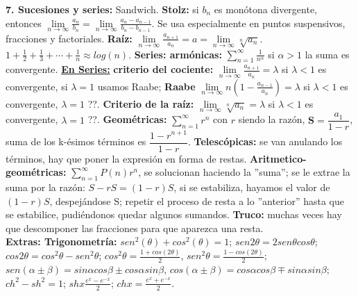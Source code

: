 \documentclass[a4paper, landscape, 11pt]{article}
\begin{document}
\textbf{7. Sucesiones y series:} Sandwich. \textbf{Stolz:} si $b_n$ es monótona divergente, entonces $\lim\limits_{n \to \infty}\frac{a_n}{b_n} = \lim\limits_{n \to \infty}\frac{a_n - a_{n-1}}{b_n - b_{n-1}}$. Se usa especialmente en puntos suspensivos, fracciones y factoriales. \textbf{Raíz:} $\lim\limits_{n \to \infty} \frac{a_{n + 1}}{a_n} = a = \lim\limits_{n\to \infty} \sqrt[n]{a_n}$. $1 + \frac{1}{2} + \frac{1}{3} + \cdots + \frac{1}{n} \approx log(n)$. \textbf{Series: armónicas:} $\sum\limits_{n=1}^{\infty}\frac{1}{n^{\alpha}}$ si $\alpha > 1$ la suma es convergente. \textbf{\underline{En Series:}} \textbf{criterio del cociente:} $\lim\limits_{n \to \infty} \frac{a_{n+1}}{a_n} = \lambda$ si $\lambda < 1$ es convergente, si $\lambda = 1$ usamos Raabe; \textbf{Raabe} $\lim\limits_{n \to \infty} n(1 - \frac{a_{n-1}}{a_n}) = \lambda$ si $\lambda < 1$ es convergente, $\lambda = 1$ ??. \textbf{Criterio de la raíz:} $\lim\limits_{n \to \infty} \sqrt[n]{a_{n}} = \lambda$ si $\lambda < 1$ es convergente, $\lambda = 1$ ??. \textbf{Geométricas:} $\sum\limits_{n = 1}^{\infty} r^n$ con $r$ siendo la razón, $\mathbf{S} = \dfrac{a_1}{1 - r}$, suma de los k-ésimos términos es $\dfrac{1 - r^{n+1}}{1 - r}$. \textbf{Telescópicas:} se van anulando los términos, hay que poner la expresión en forma de restas. \textbf{Aritmetico-geométricas:} $\sum\limits_{n = 1}^{\infty}P(n)r^{n}$, se solucionan haciendo la ''suma''; se le extrae la suma por la razón: $S - rS = (1 - r) S$, si se estabiliza, hayamos el valor de $(1 - r ) S$, despejándose S; repetir el proceso de resta a lo ''anterior'' hasta que se estabilice, pudiéndonos quedar algunos sumandos. \textbf{Truco:} muchas veces hay que descomponer las fracciones para que aparezca una resta.
\\

\textbf{Extras: Trigonometría:} $sen^{2}(\theta) + cos^{2}(\theta) = 1$; $sen2\theta = 2sen\theta cos\theta$; $cos2\theta = cos^{2}\theta - sen^{2}\theta$; $cos^{2}\theta = \frac{1 + cos(2\theta)}{2}$, $sen^{2}\theta = \frac{1 - cos(2\theta)}{2}$; $sen(\alpha \pm \beta) =
sin\alpha cos\beta \pm cos\alpha sin\beta$, $cos(\alpha \pm \beta) = cos\alpha cos\beta \mp sin\alpha sin\beta$; $ch^{2} - sh^{2} = 1$; $shx \frac{e^x - e^{-x}}{2}$; $chx = \frac{e^x + e^{-x}}{2}$.

\let\thefootnote\relax{}
\end{document}
